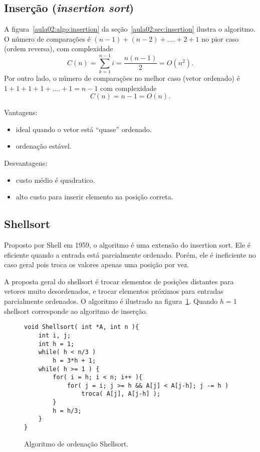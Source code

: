\subsection{Inserção (\emph{insertion sort})}

A figura~\ref{aula02:algo:insertion} da seção~\ref{aula02:sec:insertion} ilustra
o algoritmo.
%
O número de comparações é $(n-1)+(n-2)+....+2+1$ no pior caso (ordem reversa), com complexidade
\begin{equation*}
C(n) = \sum_{k=1}^{n-1} i = \frac{n(n-1)}{2} = O(n^2).
\end{equation*}
Por outro lado, o número de comparações no melhor caso (vetor ordenado) é 
$1 + 1 + 1 + 1+ .... + 1 = n-1$ com complexidade
\begin{equation*}
C(n) = n - 1  = O(n).
\end{equation*}


Vantagens:
\begin{itemize}
\item ideal quando o vetor está ``quase'' ordenado.
\item ordenação estável.
\end{itemize}
Desvantagens:
\begin{itemize}
\item custo médio é quadratico.
\item alto custo para inserir elemento na posição correta.
\end{itemize}

\subsection{Shellsort}

Proposto por Shell em 1959, o algoritmo é uma extensão do insertion sort.
Ele é eficiente quando a entrada está parcialmente ordenado.
Porém, ele é  ineficiente no caso geral pois troca os valores apenas uma posição por vez.

A proposta geral do shellsort é trocar elementos de posições distantes para vetores muito
desordenados, e trocar elementos próximos para entradas parcialmente ordenados.
O algoritmo é ilustrado na figura~\ref{aula03:algo:shellsort}.
Quando $h = 1$ shellsort corresponde ao algoritmo de inserção.
\begin{figure}[!htb]
\centering
\begin{framed}
\begin{lstlisting}
void Shellsort( int *A, int n ){
	int i, j;
	int h = 1;
	while( h < n/3 )
		h = 3*h + 1;
	while( h >= 1 ) {
		for( i = h; i < n; i++ ){
			for( j = i; j >= h && A[j] < A[j-h]; j -= h )
				troca( A[j], A[j-h] );
		}
		h = h/3;
	}
}
\end{lstlisting}
\end{framed}
\caption{Algoritmo de ordenação Shellsort.}
\label{aula03:algo:shellsort}
\end{figure}

